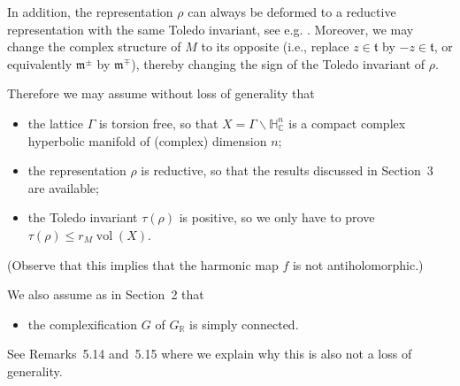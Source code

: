 In addition, the representation $\rho$ can always be deformed to a reductive representation with the same Toledo invariant, see e.g. \cite[Lem.~4.11]{jep93KM17}. Moreover, we may change the complex structure of $M$ to its opposite (i.e., replace $z\in\mathfrak t$ by $-z\in\mathfrak t$, or equivalently $\mathfrak m^{\pm}$ by $\mathfrak m^{\mp}$), thereby changing the sign of the Toledo invariant of $\rho$.

Therefore we may assume without loss of generality that
\begin{itemize}
\item the lattice $\Gamma$ is torsion free, so that $X=\Gamma\backslash\mathbb H^n_{\mathbb C}$ is a compact complex hyperbolic manifold of (complex) dimension $n$;
\item the representation $\rho$ is reductive, so that the results discussed in Section~3 are available;
\item the Toledo invariant $\tau(\rho)$ is positive, so we only have to prove $\tau(\rho)\leqslant r_M\operatorname{vol}(X)$.
\end{itemize}
(Observe that this implies that the harmonic map $f$ is not antiholomorphic.)

We also assume as in Section~2 that
\begin{itemize}\item the complexification $G$ of $G_{\mathbb R}$ is simply connected.\end{itemize}
See Remarks~5.14 and~5.15 where we explain why this is also not a loss of generality.
